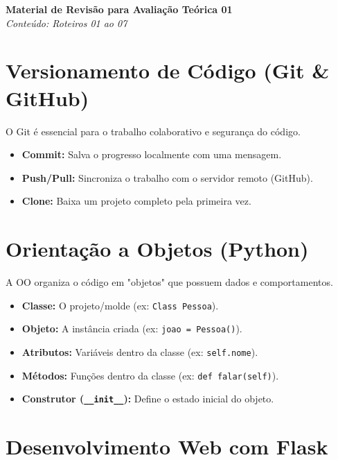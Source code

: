 \documentclass[12pt,a4paper]{article}
\begin{document}
\begin{center}
    {\LARGE \textbf{Material de Revisão para Avaliação Teórica 01}}\\
    \vspace{0.2cm}
    \textit{Conteúdo: Roteiros 01 ao 07}
\end{center}

\vspace{0.5cm}

\section{Versionamento de Código (Git \& GitHub)}

O Git é essencial para o trabalho colaborativo e segurança do código.

\begin{itemize}
    \item \textbf{Commit:} Salva o progresso localmente com uma mensagem.
    \item \textbf{Push/Pull:} Sincroniza o trabalho com o servidor remoto (GitHub).
    \item \textbf{Clone:} Baixa um projeto completo pela primeira vez.
\end{itemize}

\section{Orientação a Objetos (Python)}

A OO organiza o código em "objetos" que possuem dados e comportamentos.

\begin{boxRevisao}
\begin{itemize}
    \item \textbf{Classe:} O projeto/molde (ex: \texttt{Class Pessoa}).
    \item \textbf{Objeto:} A instância criada (ex: \texttt{joao = Pessoa()}).
    \item \textbf{Atributos:} Variáveis dentro da classe (ex: \texttt{self.nome}).
    \item \textbf{Métodos:} Funções dentro da classe (ex: \texttt{def falar(self)}).
    \item \textbf{Construtor (\texttt{\_\_init\_\_}):} Define o estado inicial do objeto.
\end{itemize}
\end{boxRevisao}

\section{Desenvolvimento Web com Flask}
\end{document}
